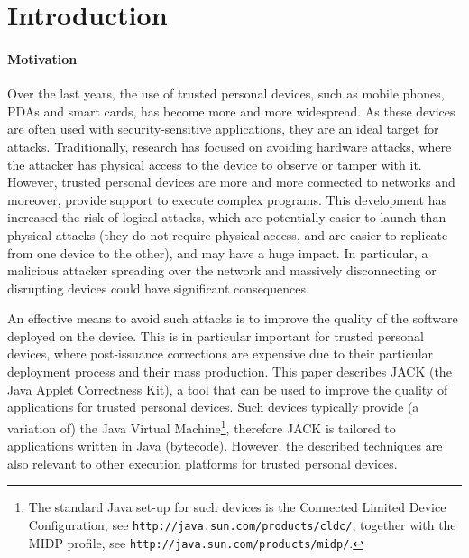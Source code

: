 \section{Introduction}\label{SecIntro}

\paragraph{Motivation}
Over the last years, the use of trusted personal devices, such as
mobile phones, PDAs and smart cards, has become more and more
widespread. As these devices are often used with security-sensitive
applications, they are an ideal target for attacks. Traditionally,
research has focused on avoiding hardware attacks, where the attacker
has physical access to the device to observe or tamper with
it. However, trusted personal devices are more and more connected to
networks and moreover, provide support to execute complex
programs. This development has increased the risk of logical attacks,
which are potentially easier to launch than physical attacks (they do
not require physical access, and are easier to replicate from one
device to the other), and may have a huge impact.  In particular, a
malicious attacker spreading over the network and massively
disconnecting or disrupting devices could have significant
consequences.

An effective means to avoid such attacks is to improve the quality of
the software deployed on the device. This is in particular important
for trusted personal devices, where post-issuance corrections are
expensive due to their particular deployment process and their mass
production. This paper describes JACK (the Java Applet Correctness
Kit), a tool that can be used to improve the quality of applications
for trusted personal devices. Such devices typically provide (a
variation of) the Java Virtual Machine\footnote{The standard Java
set-up for such devices is the Connected Limited Device Configuration,
see \texttt{http://java.sun.com/products/cldc/}, together with the
MIDP profile, see \texttt{http://java.sun.com/products/midp/}.},
therefore JACK is tailored to applications written in Java
(bytecode). However, the described techniques are also relevant to
other execution platforms for trusted personal devices.



